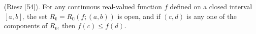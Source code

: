 (Riesz [54]). For any continuous real-valued function $f$ defined on a closed interval $[a, b]$, the set $R_0 = R_0(f; (a, b))$ is open, and if $(c, d)$ is any one of the components of $R_0$, then $f(c) \leq f(d)$.
